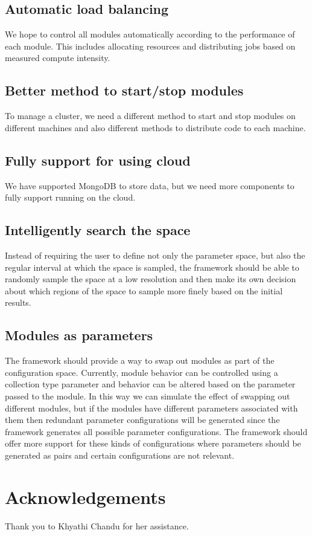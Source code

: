 \documentclass{article}
\begin{document}
    \subsection{Automatic load balancing}
    We hope to control all modules automatically according to the performance of each module. This includes allocating resources and distributing jobs based on measured compute intensity.

    \subsection{Better method to start/stop modules}
    To manage a cluster, we need a different method to start and stop modules on different machines and also different methods to distribute code to each machine.

    \subsection{Fully support for using cloud}
    We have supported MongoDB to store data, but we need more components to fully support running on the cloud.

    \subsection{Intelligently search the space}
    Instead of requiring the user to define not only the parameter space, but also the regular interval at which the space is sampled, the framework should be able
    to randomly sample the space at a low resolution and then make its own decision about which regions of the space to sample more finely based on the initial results.

    \subsection{Modules as parameters}
    The framework should provide a way to swap out modules as part of the configuration space. Currently, module behavior can be controlled using a collection type parameter
    and behavior can be altered based on the parameter passed to the module. In this way we can simulate the effect of swapping out different modules, but if the modules
    have different parameters associated with them then redundant parameter configurations will be generated since the framework generates all possible parameter configurations.
    The framework should offer more support for these kinds of configurations where parameters should be generated as pairs and certain configurations are not relevant.

\section*{Acknowledgements}
Thank you to Khyathi Chandu for her assistance.




\end{document}
